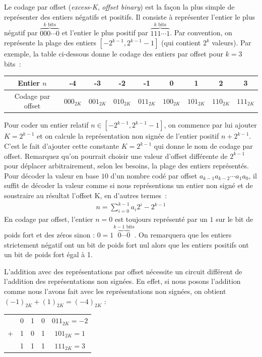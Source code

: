 Le codage par offset (\emph{excess-K}, \emph{offset binary}) est la façon la plus simple de représenter des entiers négatifs et positifs. Il consiste à représenter l'entier le plus négatif par $\overbrace{000\cdots 0}^{k \mbox{ bits}}$ et l'entier le plus positif par $\overbrace{111\cdots 1}^{k\mbox{ bits}}$. Par convention, on représente la plage des entiers $[-2^{k-1}, 2^{k-1}-1]$ (qui contient $2^k$ valeurs). Par exemple, la table ci-dessous donne le codage des entiers par offset pour $k=3$ bits~:
\begin{center}
\begin{tabular}{c|c|c|c|c|c|c|c|c}
Entier $n$ & -4 & -3 & -2& -1 & 0 & 1 & 2 & 3\\
\hline
Codage par offset & $000_{2K}$ & $001_{2K}$ & $010_{2K}$ & $011_{2K}$ & $100_{2K}$ & $101_{2K}$ & $110_{2K}$ & $111_{2K}$
\end{tabular}
\end{center}
Pour coder un entier relatif $n \in [-2^{k-1}, 2^{k-1}-1]$, on commence par lui ajouter $K=2^{k-1}$ et on calcule la représentation non signée de l'entier positif $n+2^{k-1}$. C'est le fait d'ajouter cette constante $K = 2^{k-1}$ qui donne le nom de codage par offset. Remarquez qu'on pourrait choisir une valeur d'offset différente de $2^{k-1}$ pour déplacer arbitrairement, selon les besoins, la plage des entiers représentés. Pour décoder la valeur en base $10$ d'un nombre codé par offset $a_{k-1}a_{k-2}\cdots a_{1}a_{0}$, il suffit de décoder la valeur comme si nous représentions un entier non signé et de soustraire au résultat l'offset K, en d'autres termes~:
\begin{eqnarray*}
 n = \sum_{i=0}^{k-1} a_i 2^i - 2^{k-1}
\end{eqnarray*}
En codage par offset, l'entier $n=0$ est toujours représenté par un $1$ sur le bit de poids fort et des zéros sinon : $0 = 1\overbrace{0\cdots 0}^{k-1\mbox{ bits}}$. On remarquera que les entiers strictement négatif ont un bit de poids fort nul alors que les entiers positifs ont un bit de poids fort égal à 1.

L'addition avec des représentations par offset nécessite un circuit différent de l'addition des représentations non signées. En effet, si nous posons l'addition comme nous l'avons fait avec les représentations non signées, on obtient $(-1)_{2K} + (1)_{2K} = (-4)_{2K}$ :

\begin{center}
\begin{tabular}{ccccc}
  & 0 & 1 & 0 & $011_{2K} = -2$\\
+ & 1 & 0 & 1 & $101_{2K}= 1$\\
\cline{0-3}
  & 1 & 1 & 1 & $111_{2K} = 3$
\end{tabular}
\end{center}

